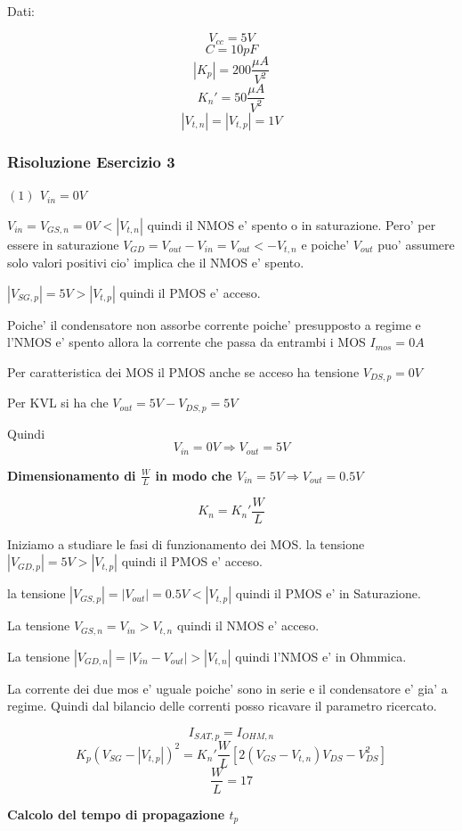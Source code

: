 \documentclass[\main/main.tex]{subfiles}
\begin{document}
Dati:

\[V_{cc} = 5V\]
\[C = 10pF\]
\[|K_p| = 200 \frac{\mu A}{V^2}\]
\[K_n' = 50 \frac{\mu A}{V^2}\]
\[|V_{t,n}| = |V_{t,p}| = 1V\]

\clearpage
\subsubsection{Risoluzione Esercizio 3}

\textbf{$(1)$ $V_{in} = 0V$}

$V_{in} = V_{GS,n} = 0V < |V_{t,n}|$ quindi il NMOS e' spento o in saturazione.
Pero' per essere in saturazione $V_{GD} = V_{out} - V_{in} = V_{out} < -V_{t,n}$
e poiche' $V_{out}$ puo' assumere solo valori positivi cio' implica che il NMOS e' spento.

$|V_{SG,p}| = 5V > |V_{t,p}|$ quindi il PMOS e' acceso.

Poiche' il condensatore non assorbe corrente poiche' presupposto a regime e l'NMOS e' spento allora la corrente che passa da entrambi i MOS $I_{mos} = 0A$

Per caratteristica dei MOS il PMOS anche se acceso ha tensione $V_{DS,p} = 0V$

Per KVL si ha che $V_{out} = 5V - V_{DS,p} = 5V$

Quindi \[ V_{in} = 0V \Rightarrow V_{out} = 5V\]

\textbf{Dimensionamento di $\frac{W}{L}$ in modo che $V_{in} = 5V \Rightarrow V_{out} = 0.5V$}

\[ K_n = K_n' \frac{W}{L} \]

Iniziamo a studiare le fasi di funzionamento dei MOS.
la tensione $|V_{GD,p}| = 5V > |V_{t,p}|$ quindi il PMOS e' acceso.

la tensione $|V_{GS,p}| = |V_{out}| = 0.5V < |V_{t,p}|$ quindi il PMOS e' in Saturazione.

La tensione $V_{GS,n} = V_{in} > V_{t,n}$ quindi il NMOS e' acceso.

La tensione $|V_{GD,n}| = |V_{in} - V_{out}| > |V_{t,n}|$ quindi l'NMOS e' in Ohmmica.

La corrente dei due mos e' uguale poiche' sono in serie e il condensatore e' gia' a regime.
Quindi dal bilancio delle correnti posso ricavare il parametro ricercato.

\[I_{SAT,p} = I_{OHM,n}\]
\[K_p \left(V_{SG} - |V_{t,p}| \right)^2 = K_n' \frac{W}{L} \left[ 2 \left( V_{GS} - V_{t,n} \right) V_{DS} - V_{DS}^2 \right]\]
\[\frac{W}{L} = 17\]

\textbf{Calcolo del tempo di propagazione $t_p$}
\end{document}
